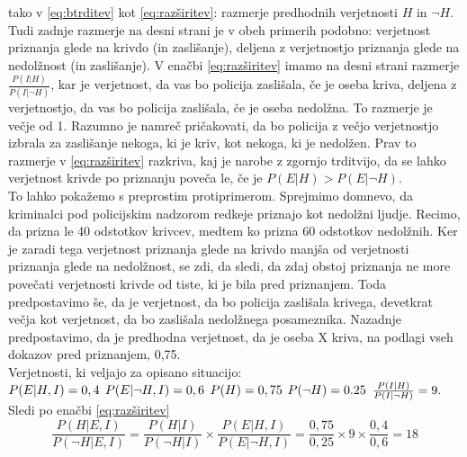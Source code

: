 \documentclass[12pt,a4paper]{amsart}
\theoremstyle{definition} %
\theoremstyle{plain} %
\begin{document}
tako v \eqref{eq:btrditev} kot \eqref{eq:razširitev}: razmerje predhodnih verjetnosti $H$ in $\neg H$. Tudi zadnje razmerje na desni strani je v obeh primerih podobno: verjetnost priznanja glede na 
krivdo (in zaslišanje), deljena z verjetnostjo priznanja glede na nedolžnost (in zaslišanje). V enačbi \eqref{eq:razširitev} imamo na desni strani razmerje 
$\frac{P(I \lvert H)}{P(I \lvert \neg H)}$, kar je verjetnost, da vas bo policija zaslišala, če je oseba kriva, deljena z verjetnostjo, da vas bo policija 
zaslišala, če je oseba nedolžna. To razmerje je večje od 1. Razumno je namreč pričakovati, da bo policija z večjo verjetnostjo izbrala za zaslišanje nekoga, 
ki je kriv, kot nekoga, ki je nedolžen. Prav to razmerje v \eqref{eq:razširitev} razkriva, kaj je narobe z zgornjo trditvijo, da se lahko verjetnost krivde po priznanju poveča le, 
če je $P(E \lvert H) > P(E \lvert \neg H)$. \\
To lahko pokažemo s preprostim protiprimerom. Sprejmimo domnevo, da kriminalci pod policijskim nadzorom redkeje priznajo kot nedolžni ljudje. Recimo, da prizna 
le 40 odstotkov krivcev, medtem ko prizna 60 odstotkov nedolžnih. Ker je zaradi tega verjetnost priznanja glede na krivdo manjša od verjetnosti priznanja glede 
na nedolžnost, se zdi, da sledi, da zdaj obstoj priznanja ne more povečati verjetnosti krivde od tiste, ki je bila pred priznanjem. Toda predpostavimo še, 
da je verjetnost, da bo policija zaslišala krivega, devetkrat večja kot verjetnost, da bo zaslišala nedolžnega posameznika. Nazadnje predpostavimo, da je 
predhodna verjetnost, da je oseba X kriva, na podlagi vseh dokazov pred priznanjem, 0,75. \\
Verjetnosti, ki veljajo za opisano situacijo:\\ \vspace{2mm}
$P(E \lvert H, I) = 0,4\\ \vspace{2mm}$
$P(E \lvert \neg H, I) = 0,6\\ \vspace{2mm}$
$P(H) = 0,75\\ \vspace{2mm}$
$P(\neg H) = 0.25\\ \vspace{2mm}$
$\frac{P(I \lvert H)}{P(I \lvert \neg H)} = 9.\\ \vspace{2mm}$
Sledi po enačbi \eqref{eq:razširitev}
\begin{equation}\label{eq:rezultat}
    \frac{P(H \lvert E, I)}{P(\neg H \lvert E, I)}  = \frac{P(H \lvert I)}{P(\neg H \lvert I)}  \times \frac{P(E \lvert H, I)}{P(E \lvert \neg H, I)} = \frac{0,75}{0,25} \times 9 \times \frac{0,4}{0,6} = 18
\end{equation}
\end{document}

